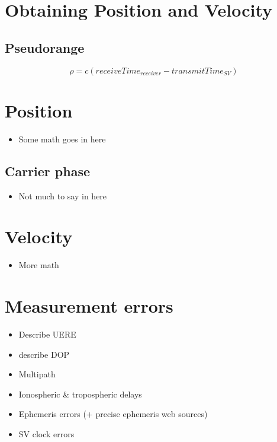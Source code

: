 \section{Obtaining Position and Velocity}

\subsection{Pseudorange}

%
\[\rho = c (receiveTime_{receiver} - transmitTime_{SV})\]
%

\section{Position}
\begin{itemize}
\item Some math goes in here
\end{itemize}

\subsection{Carrier phase}
\begin{itemize}
\item Not much to say in here
\end{itemize}

\section{Velocity}
\begin{itemize}
\item More math
\end{itemize}

\section{Measurement errors}
\begin{itemize}
\item Describe UERE
\item describe DOP
\label{sec:gps-dop}
\end{itemize}

\begin{itemize}
\item Multipath
\item Ionospheric \& tropospheric delays
\item Ephemeris errors (+ precise ephemeris web sources)
\item SV clock errors
\end{itemize}

